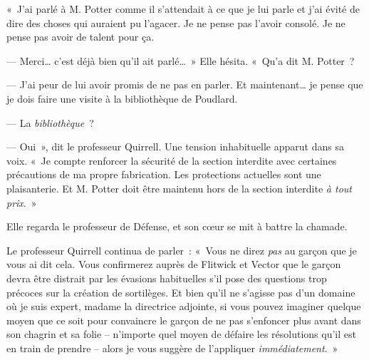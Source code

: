 «~J'ai parlé à M. Potter comme il s'attendait à ce que je lui parle et j'ai évité de dire des choses qui auraient pu l'agacer. Je ne pense pas l'avoir consolé. Je ne pense pas avoir de talent pour ça.

--- Merci… c'est déjà bien qu'il ait parlé…~» Elle hésita. «~Qu'a dit M. Potter~?

--- J'ai peur de lui avoir promis de ne pas en parler. Et maintenant… je pense que je dois faire une visite à la bibliothèque de Poudlard.

--- La \emph{bibliothèque}~?

--- Oui~», dit le professeur Quirrell. Une tension inhabituelle apparut dans sa voix. «~Je compte renforcer la sécurité de la section interdite avec certaines précautions de ma propre fabrication. Les protections actuelles sont une plaisanterie. Et M. Potter doit être maintenu hors de la section interdite \emph{à tout prix}.~»

Elle regarda le professeur de Défense, et son cœur se mit à battre la chamade.

Le professeur Quirrell continua de parler~: «~Vous ne direz \emph{pas} au garçon que je vous ai dit cela. Vous confirmerez auprès de Flitwick et Vector que le garçon devra être distrait par les évasions habituelles s'il pose des questions trop précoces sur la création de sortilèges. Et bien qu'il ne s'agisse pas d'un domaine où je suis expert, madame la directrice adjointe, si vous pouvez imaginer quelque moyen que ce soit pour convaincre le garçon de ne pas s'enfoncer plus avant dans son chagrin et sa folie -- n'importe quel moyen de défaire les résolutions qu'il est en train de prendre -- alors je vous suggère de l'appliquer \emph{immédiatement}.~»
